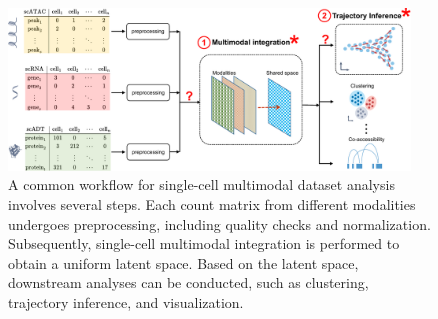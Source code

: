 \begin{figure}[!ht]
	\centering
	\includegraphics[width=0.95\textwidth]{workflow_multimodal/fig}
	\vspace{0.1cm}
	\caption[A common computational multimodal analysis workflow.]{A common workflow for single-cell multimodal dataset analysis involves several steps. Each count matrix from different modalities undergoes preprocessing, including quality checks and normalization. Subsequently, single-cell multimodal integration is performed to obtain a uniform latent space. Based on the latent space, downstream analyses can be conducted, such as clustering, trajectory inference, and visualization.}
	\label{fig:workflow_multimodal}
\end{figure}

